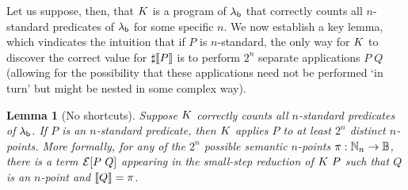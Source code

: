\documentclass[12pt,phd,lfcs,twoside,openright,logo,leftchapter,normalheadings]{infthesis}
\theoremstyle{plain}
\newtheorem{lemma}[theorem]{Lemma}
\theoremstyle{definition}
\begin{document}
Let us suppose, then, that $K$ is a program of $\lambda_{\mathsf{b}}$ that correctly counts
all $n$-standard predicates of $\lambda_{\mathsf{b}}$ for some specific $n$.
We now establish a key lemma, which vindicates the \naive intuition
that if $P$ is $n$-standard, the only way for $K$ to discover the correct
value for $\sharp \val{P}$ is to perform $2^n$ separate applications $P\;Q$
(allowing for the possibility that these applications need not
be performed `in turn' but might be nested in some complex way).

\begin{lemma}[No shortcuts]\label{lem:no-shortcuts}
  Suppose $K$ correctly counts all $n$-standard predicates of $\lambda_{\mathsf{b}}$.
  If $P$ is an $n$-standard predicate,
  then $K$ applies $P$ to at least $2^n$ distinct $n$-points.
  More formally, for any of the $2^n$ possible semantic $n$-points
  $\pi : \mathbb{N}_n \to \mathbb{B}$, there is a term $\mathcal{E}[P~Q]$ appearing in the
  small-step reduction of $K~P$ such that $Q$ is an $n$-point and $\llbracket Q \rrbracket = \pi$.
\end{lemma}
\end{document}
